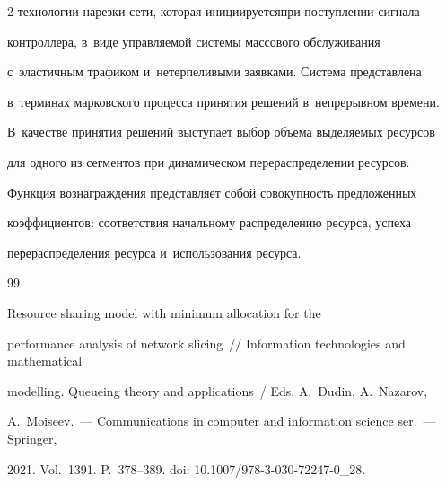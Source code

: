 \begin{multicols}{2}
технологии нарезки сети, которая инициируется\linebreak при поступлении сигнала 


контроллера, в~виде управ\-ля\-емой сис\-те\-мы массового обслуживания 


с~эластичным трафиком и~нетерпеливыми заявками. Сис\-те\-ма пред\-став\-ле\-на 


в~терминах марковского процесса принятия решений в~непрерывном времени. 


В~качестве принятия решений выступает выбор объема выделяемых ресурсов 


для одного из сегментов при динамическом перераспределении ресурсов. 


Функция вознаграждения представляет собой со\-во\-куп\-ность предложенных 


коэффициентов: соответствия начальному распределению ресурса, успеха 


перераспределения ресурса и~использования ресурса. 





\vspace*{-16pt}


  


{\small\frenchspacing


 {%




 \begin{thebibliography}{99}


 


 \vspace*{-2pt}







 Resource sharing model with minimum allocation for the 


performance analysis of network slicing~// Information technologies and mathematical 


modelling. Queueing theory and applications~/ Eds. A.~Dudin, A.~Nazarov, 


A.~Moiseev.~--- Communications in computer and information science ser.~--- Springer, 


2021. Vol.~1391. P.~378--389. doi: 10.1007/978-3-030-72247-0\_28.






\end{thebibliography}}}
\end{multicols}
